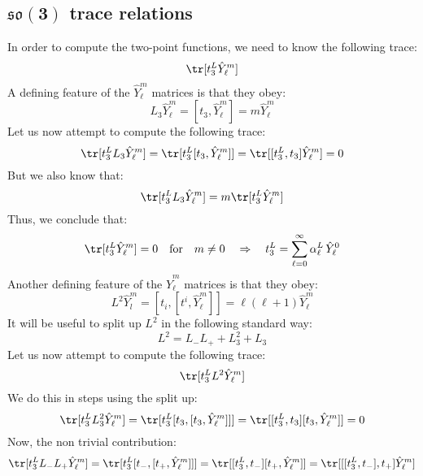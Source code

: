 \subsection[$\mathfrak{so}(3)$ trace relations]{$\mathbf{\mathfrak{so}(3)}$ trace relations}
In order to compute the two-point functions, we need to know the following trace:
%
%
\begin{equation}
\tr[ t_3^L \hat{Y}_\ell^m ]
\end{equation}
%
%
A defining feature of the $\hat{Y}_\ell^m$ matrices is that they obey:
%
%
\begin{equation}
L_3 \hat{Y}_\ell^m = [t_3, \hat{Y}_\ell^m] = m \hat{Y}_\ell^m
\end{equation}
%
%
Let us now attempt to compute the following trace:
%
%
\begin{equation}
\tr[ t_3^L L_3 \hat{Y}_\ell^m ]
=
\tr[ t_3^L [t_3, \hat{Y}_\ell^m] ]
=
\tr[ [t_3^L, t_3] \hat{Y}_\ell^m ]
=
0
\end{equation}
%
%
But we also know that:
%
%
\begin{equation}
\tr[ t_3^L L_3 \hat{Y}_\ell^m ]
=
m \tr[ t_3^L \hat{Y}_\ell^m ]
\end{equation}
%
%
Thus, we conclude that:
%
%
\begin{equation}
\tr[ t_3^L \hat{Y}_\ell^m ] = 0
%
\quad \text{for} \quad
%
m \neq 0
%
\quad \Rightarrow \quad
%
t_3^L = \sum_{\ell=0}^{\infty} \alpha_{\ell}^L \, \hat{Y}_\ell^0
\end{equation}
%
%
Another defining feature of the $\hat{Y}_\ell^m$ matrices is that they obey:
%
%
\begin{equation}
L^2 \hat{Y}_l^m = [t_i, [t^i, \hat{Y}_\ell^m]] = \ell (\ell + 1) \hat{Y}_\ell^m
\end{equation}
%
%
It will be useful to split up $L^2$ in the following standard way:
%
%
\begin{equation}
L^2 = L_- L_+ + L_3^2 + L_3
\end{equation}
%
%
Let us now attempt to compute the following trace:
%
%
\begin{equation}
\tr[ t_3^L L^2 \hat{Y}_\ell^m ]
\end{equation}
%
%
We do this in steps using the split up:
%
%
\begin{equation}
\tr[ t_3^L L_3^2 \hat{Y}_\ell^m ]
=
\tr[ t_3^L [t_3, [t_3, \hat{Y}_\ell^m]] ]
=
\tr[ [t_3^L, t_3] [t_3, \hat{Y}_\ell^m] ]
=
0
\end{equation}
%
%
Now, the non trivial contribution:
%
%
\begin{equation}
\tr[ t_3^L L_- L_+ \hat{Y}_\ell^m ]
=
\tr[ t_3^L [t_-, [t_+, \hat{Y}_\ell^m]] ]
=
\tr[ [t_3^L, t_-] [t_+, \hat{Y}_\ell^m] ]
=
\tr[ [[t_3^L, t_-], t_+] \hat{Y}_\ell^m ]
\end{equation}
%
%

